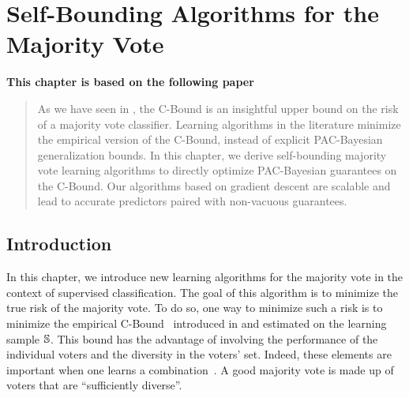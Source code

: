 \chapter{Self-Bounding Algorithms for the Majority Vote}
\label{chap:mv}

\addchapterlof
\addchapterloa
\addchapterloe

\vspace{-1.5cm}
\begin{center}
\textbf{This chapter is based on the following paper}\\[0.1cm]
\end{center}

\minitoc

\begin{abstract}
As we have seen in , the C-Bound is an insightful upper bound on the risk of a majority vote classifier.
Learning algorithms in the literature minimize the empirical version of the C-Bound, instead of explicit PAC-Bayesian generalization bounds.
In this chapter, we derive self-bounding majority vote learning algorithms to directly optimize PAC-Bayesian guarantees on the C-Bound.
Our algorithms based on gradient descent are scalable and lead to accurate predictors paired with non-vacuous guarantees.
\end{abstract}

\newpage

\section{Introduction}

In this chapter, we introduce new learning algorithms for the majority vote in the context of supervised classification.
The goal of this algorithm is to minimize the true risk of the majority vote.
To do so, one way to minimize such a risk is to minimize the empirical C-Bound~\citep{Breiman2001,LacasseLavioletteMarchandGermainUsunier2006} introduced in  and estimated on the learning sample $\S$.
This bound has the advantage of involving the performance of the individual voters and the diversity in the voters' set. 
Indeed, these elements are important when one learns a  combination~\citep{Dietterich2000,Kuncheva2014}.
A good majority vote is made up of voters that are ``sufficiently diverse''.\\

